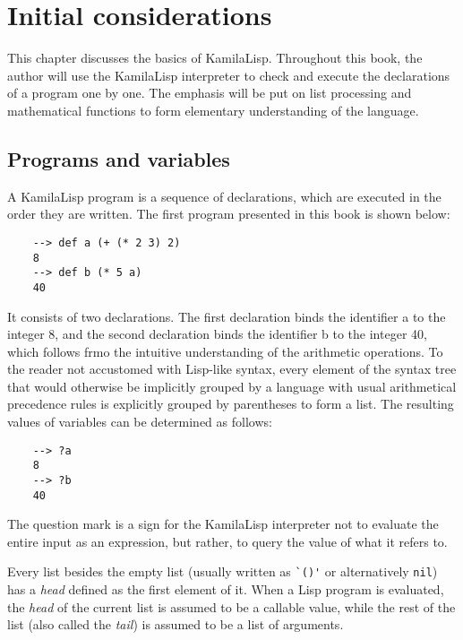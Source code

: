 
\chapter{Initial considerations}

This chapter discusses the basics of KamilaLisp. Throughout this book, the author will use the KamilaLisp interpreter to check and execute the declarations of a program one by one. The emphasis will be put on list processing and mathematical functions to form elementary understanding of the language.

\section{Programs and variables}

A KamilaLisp program is a sequence of declarations, which are executed in the order they are written. The first program presented in this book is shown below:

\begin{Verbatim}
    --> def a (+ (* 2 3) 2)
    8
    --> def b (* 5 a)
    40
\end{Verbatim}

It consists of two declarations. The first declaration binds the identifier a to the integer 8, and the second declaration binds the identifier b to the integer 40, which follows frmo the intuitive understanding of the arithmetic operations. To the reader not accustomed with Lisp-like syntax, every element of the syntax tree that would otherwise be implicitly grouped by a language with usual arithmetical precedence rules is explicitly grouped by parentheses to form a list. The resulting values of variables can be determined as follows:

\begin{Verbatim}
    --> ?a
    8
    --> ?b
    40
\end{Verbatim}

The question mark is a sign for the KamilaLisp interpreter not to evaluate the entire input as an expression, but rather, to query the value of what it refers to.

Every list besides the empty list (usually written as \verb|`()'| or alternatively \verb|nil|) has a \textit{head} defined as the first element of it. When a Lisp program is evaluated, the \textit{head} of the current list is assumed to be a callable value, while the rest of the list (also called the \textit{tail}) is assumed to be a list of arguments.

